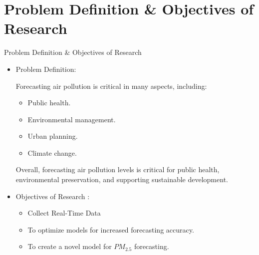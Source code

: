 \documentclass[12pt, aspectratio=169]{beamer}
\begin{document}
\section[Problem \& Objectives]{Problem Definition \& Objectives of Research}
\begin{frame}{Problem Definition \& Objectives of Research}
	\begin{itemize}
		\item Problem Definition:
		\par Forecasting air pollution is critical in many aspects, including:
		\begin{itemize}
			\item Public health.\\
			\item Environmental management. \\
			\item Urban planning.\\
			\item Climate change.\\
		\end{itemize}
		\par Overall, forecasting air pollution levels is critical for public health, environmental preservation, and supporting sustainable development.

		\item Objectives of Research :
		\begin{itemize}
			\item Collect Real-Time Data
			\item To optimize models for increased forecasting accuracy. \\
			\item To create a novel model for $PM_{2.5}$ forecasting.\\
		\end{itemize}
	\end{itemize}
\end{frame}
  
 
\end{document}
